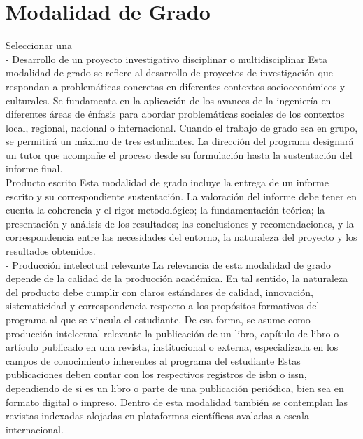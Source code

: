 \chapter*{Modalidad de Grado}

Seleccionar una
\\[1cm]
-	Desarrollo de un proyecto investigativo disciplinar o multidisciplinar
Esta modalidad de grado se refiere al desarrollo de proyectos de investigación que respondan a problemáticas concretas en diferentes contextos socioeconómicos y culturales. Se fundamenta en la aplicación de los avances de la ingeniería en diferentes áreas de énfasis para abordar problemáticas sociales de los contextos local, regional, nacional o internacional.
Cuando el trabajo de grado sea en grupo, se permitirá un máximo de tres estudiantes. La dirección del programa designará un tutor que acompañe el proceso desde su formulación hasta la sustentación del informe final.
\\[1cm]
Producto escrito
Esta modalidad de grado incluye la entrega de un informe escrito y su correspondiente sustentación. La valoración del informe debe tener en cuenta la coherencia y el rigor metodológico; la fundamentación teórica; la presentación y análisis de los resultados; las conclusiones y recomendaciones, y la correspondencia entre las necesidades del entorno, la naturaleza del proyecto y los resultados obtenidos.
\\[1cm]
-	Producción intelectual relevante
La relevancia de esta modalidad de grado depende de la calidad de la producción académica. En tal sentido, la naturaleza del producto debe cumplir con claros estándares de calidad, innovación, sistematicidad y correspondencia respecto a los propósitos formativos del programa al que se vincula el estudiante. De esa forma, se asume como producción intelectual relevante la publicación de un libro, capítulo de libro o artículo publicado en una revista, institucional o externa, especializada en los
campos de conocimiento inherentes al programa del estudiante
Estas publicaciones deben contar con los respectivos registros de isbn o issn, dependiendo de si es un libro o parte de una publicación periódica, bien sea en formato digital o impreso. Dentro de esta modalidad también se contemplan las revistas indexadas alojadas en plataformas científicas avaladas a escala internacional.

